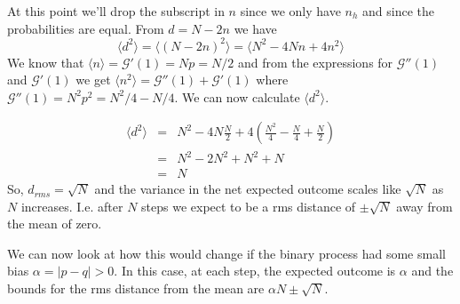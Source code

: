 \documentclass{article}
\newcommand{\calG}{\mathcal{G}}
\begin{document}
At this point we'll drop the subscript in $n$ since we only have $n_h$ and since the probabilities are equal. From $d=N-2n$ we have $$ \langle d^2\rangle = \langle (N-2n)^2\rangle = \langle N^2 -4Nn+4n^2\rangle$$
We know that $\langle n\rangle = \calG'(1)=Np=N/2$ and from the expressions for $\calG''(1)$ and $\calG'(1)$ we get $\langle n^2 \rangle = \calG''(1) + \calG'(1)$ where $\calG''(1) = N^2p^2 = N^2/4-N/4$. We can now calculate $\langle d^2 \rangle$.

\begin{eqnarray*}
	\langle d^2 \rangle &=& N^2 -4N\frac{N}{2}+4\left(\frac{N^2}{4}-\frac{N}{4}+\frac{N}{2}\right)\\
		&=& N^2-2N^2+N^2+N\\
		&=& N
\end{eqnarray*}
So, $d_{rms}=\sqrt{N}$ and the variance in the net expected outcome scales like $\sqrt{N}$ as $N$ increases. I.e. after $N$ steps we expect to be a rms distance of $\pm \sqrt{N}$ away from the mean of zero.

\begin{center}
\end{center}

We can now look at how this would change if the binary process had some small bias $\alpha = |p-q| >0$. In this case, at each step, the expected outcome is $\alpha$ and the bounds for the rms distance from the mean are $\alpha N\pm\sqrt{N}$. 

\begin{center}
\end{center}
\end{document}
